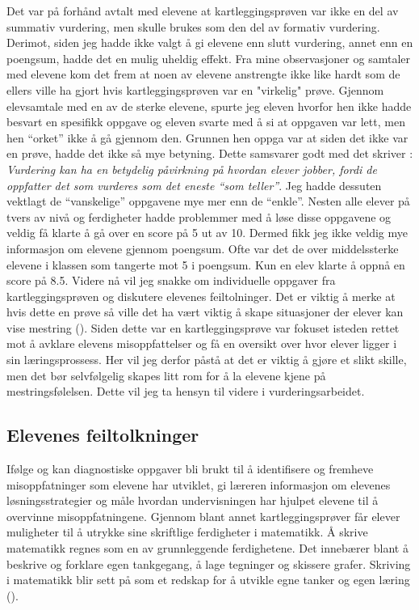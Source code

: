 \documentclass[main.tex]{subfiles}
\begin{document}
Det var på forhånd avtalt med elevene at kartleggingsprøven var ikke en del av summativ vurdering, men skulle brukes
som den del av formativ vurdering. Derimot, siden jeg hadde ikke valgt å gi elevene enn slutt vurdering, annet enn en 
poengsum, hadde det en mulig uheldig effekt. Fra mine observasjoner og samtaler med elevene kom det frem at noen av 
elevene anstrengte ikke like hardt som de ellers ville ha gjort hvis kartleggingsprøven var en "virkelig" prøve.
Gjennom elevsamtale med en av de sterke elevene, spurte jeg eleven hvorfor hen ikke hadde besvart en spesifikk 
oppgave og eleven svarte med å si at oppgaven var lett, men hen ``orket'' ikke å gå gjennom den. Grunnen hen oppga 
var at siden det ikke var en prøve, hadde det ikke så mye betyning. Dette samsvarer godt med det  
skriver : \emph{Vurdering kan ha en betydelig påvirkning på hvordan elever jobber, fordi de oppfatter det som 
vurderes som det eneste ``som teller''}.
Jeg hadde dessuten vektlagt de ``vanskelige'' oppgavene mye mer enn de ``enkle''. Nesten alle elever på tvers av nivå og 
ferdigheter hadde problemmer med å løse disse oppgavene og veldig få klarte å gå over en score på 5 ut av 10. Dermed 
fikk jeg ikke veldig mye informasjon om elevene gjennom poengsum. Ofte var det de over middelssterke elevene i klassen 
som tangerte mot 5 i poengsum. Kun en elev klarte å oppnå en score på 8.5. Videre nå vil jeg snakke om individuelle 
oppgaver fra kartleggingsprøven og diskutere elevenes feiltolninger. Det er viktig å merke at hvis dette en prøve så 
ville det ha vært viktig å skape situasjoner der elever kan vise mestring (). Siden dette var en 
kartleggingsprøve var fokuset isteden rettet mot å avklare elevens misoppfattelser og få en oversikt over hvor
elever ligger i sin læringsprossess. Her vil jeg derfor påstå at det er viktig å gjøre et slikt skille, men det
bør selvfølgelig skapes litt rom for å la elevene kjene på mestringsfølelsen. Dette vil jeg ta hensyn til videre i
vurderingsarbeidet.

\subsection*{Elevenes feiltolkninger}
Ifølge  og  kan diagnostiske oppgaver bli brukt til å identifisere og 
fremheve misoppfatninger som elevene har utviklet, gi læreren informasjon om elevenes løsningsstrategier og måle hvordan 
undervisningen har hjulpet elevene til å overvinne misoppfatningene. Gjennom blant annet kartleggingsprøver får elever 
muligheter til å utrykke sine skriftlige ferdigheter i matematikk. Å skrive matematikk regnes som en av grunnleggende 
ferdighetene. Det innebærer blant å beskrive og forklare egen tankgegang, å lage tegninger og skissere grafer. 
Skriving i matematikk blir sett på som et redskap for å utvikle egne tanker og egen læring (). 
\end{document}
